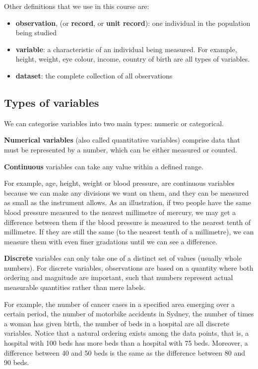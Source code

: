\documentclass[
  a4paper,
]{memoir}
\providecommand{\tightlist}{%
  \setlength{\itemsep}{0pt}\setlength{\parskip}{0pt}}\usepackage{longtable,booktabs,array}
\begin{document}
Other definitions that we use in this course are:

\begin{itemize}
\tightlist
\item
  \textbf{observation}, (or \textbf{record}, or \textbf{unit record}):
  one individual in the population being studied
\item
  \textbf{variable}: a characteristic of an individual being measured.
  For example, height, weight, eye colour, income, country of birth are
  all types of variables.
\item
  \textbf{dataset}: the complete collection of all observations
\end{itemize}

\hypertarget{types-of-variables}{%
\subsection{Types of variables}\label{types-of-variables}}

We can categorise variables into two main types: numeric or categorical.

\textbf{Numerical variables} (also called quantitative variables)
comprise data that must be represented by a number, which can be either
measured or counted.

\textbf{Continuous} variables can take any value within a defined range.

For example, age, height, weight or blood pressure, are continuous
variables because we can make any divisions we want on them, and they
can be measured as small as the instrument allows. As an illustration,
if two people have the same blood pressure measured to the nearest
millimetre of mercury, we may get a difference between them if the blood
pressure is measured to the nearest tenth of millimetre. If they are
still the same (to the nearest tenth of a millimetre), we can measure
them with even finer gradations until we can see a difference.

\textbf{Discrete} variables can only take one of a distinct set of
values (usually whole numbers). For discrete variables, observations are
based on a quantity where both ordering and magnitude are important,
such that numbers represent actual measurable quantities rather than
mere labels.

For example, the number of cancer cases in a specified area emerging
over a certain period, the number of motorbike accidents in Sydney, the
number of times a woman has given birth, the number of beds in a
hospital are all discrete variables. Notice that a natural ordering
exists among the data points, that is, a hospital with 100 beds has more
beds than a hospital with 75 beds. Moreover, a difference between 40 and
50 beds is the same as the difference between 80 and 90 beds.
\end{document}
